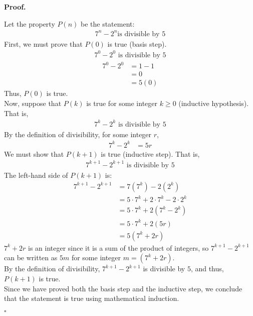 \documentclass{article}
\newenvironment{proof}{
    \begin{mdframed}[nobreak=false, innerleftmargin=10pt, innerrightmargin=10pt, innertopmargin=10pt, innerbottommargin=10pt]
    \textbf{Proof.}
}{
    \hfill $\square$
    \end{mdframed}
}
\begin{document}
    \begin{proof}
        Let the property $P(n)$ be the statement:
        \begin{align*}
            7^n-2^n \text{is divisible by } 5
        \end{align*}
        First, we must prove that $P(0)$ is true (basis step).
        \begin{align*}
            7^0-2^0 \text{ is divisible by } 5
        \end{align*}
        \begin{align*}
            7^0-2^0 &= 1-1 \\
            &= 0 \\
            &= 5(0)
        \end{align*}
        Thus, $P(0)$ is true. \\
        Now, suppose that $P(k)$ is true for some integer $k \geq 0$ (inductive hypothesis). That is,
        \begin{align*}
            7^k-2^k \text{ is divisible by } 5
        \end{align*}
        By the definition of divisibility, for some integer $r$,
        \begin{align*}
            7^k-2^k &= 5r
        \end{align*}
        We must show that $P(k+1)$ is true (inductive step). That is,
        \begin{align*}
            7^{k+1}-2^{k+1} \text{ is divisible by } 5
        \end{align*}
        The left-hand side of $P(k+1)$ is:
        \begin{align*}
            7^{k+1}-2^{k+1} &= 7(7^k)-2(2^k) \\
            &= 5\cdot7^k + 2\cdot7^k - 2\cdot2^k \\
            &= 5\cdot7^k + 2(7^k - 2^k) \\
            &= 5\cdot7^k + 2(5r) \\
            &= 5(7^k + 2r)
        \end{align*}
        $7^k + 2r$ is an integer since it is a sum of the product of integers, so $7^{k+1}-2^{k+1}$ can be written as $5m$ for some integer $m = (7^k + 2r)$. \\
        By the definition of divisibility, $7^{k+1}-2^{k+1}$ is divisible by $5$, and thus, $P(k+1)$ is true. \\
        Since we have proved both the basis step and the inductive step, we conclude that the statement is true using mathematical induction. 
    \end{proof}
\end{document}
